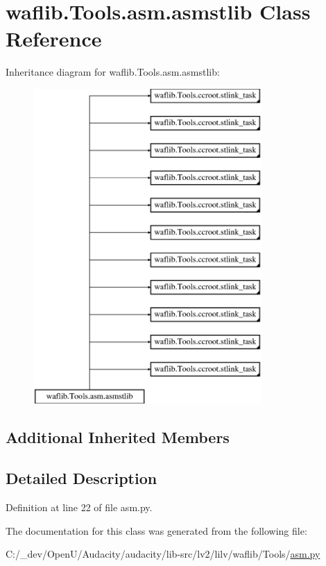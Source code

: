 \hypertarget{classwaflib_1_1_tools_1_1asm_1_1asmstlib}{}\section{waflib.\+Tools.\+asm.\+asmstlib Class Reference}
\label{classwaflib_1_1_tools_1_1asm_1_1asmstlib}
Inheritance diagram for waflib.\+Tools.\+asm.\+asmstlib\+:\begin{figure}[H]
\begin{center}
\leavevmode
\includegraphics[height=12.000000cm]{classwaflib_1_1_tools_1_1asm_1_1asmstlib}
\end{center}
\end{figure}
\subsection*{Additional Inherited Members}


\subsection{Detailed Description}


Definition at line 22 of file asm.\+py.



The documentation for this class was generated from the following file\+:\begin{DoxyCompactItemize}
\item 
C\+:/\+\_\+dev/\+Open\+U/\+Audacity/audacity/lib-\/src/lv2/lilv/waflib/\+Tools/\hyperlink{lilv_2waflib_2_tools_2asm_8py}{asm.\+py}\end{DoxyCompactItemize}
